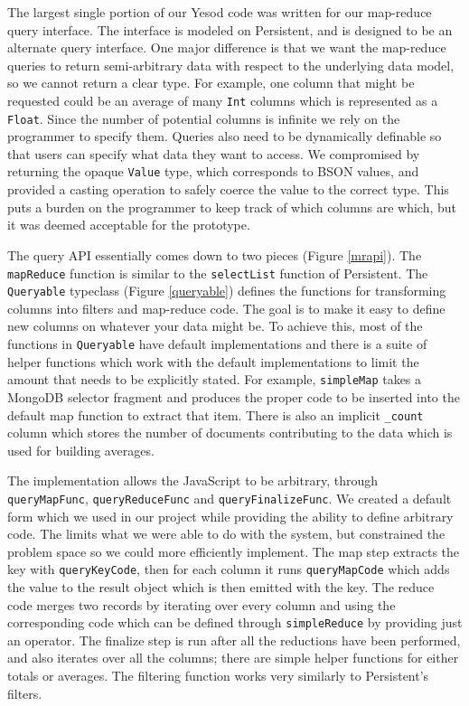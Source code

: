 \documentclass[letterpaper,twocolumn,9pt]{article}
\newcommand{\code}[1]{\texttt{#1}}
\begin{document}
The largest single portion of our Yesod code was written for our map-reduce query interface.  The interface is modeled on Persistent, and is designed to be an alternate query interface.  One major difference is that we want the map-reduce queries to return semi-arbitrary data with respect to the underlying data model, so we cannot return a clear type.  For example, one column that might be requested could be an average of many \code{Int} columns which is represented as a \code{Float}.  Since the number of potential columns is infinite we rely on the programmer to specify them.  Queries also need to be dynamically definable so that users can specify what data they want to access.  We compromised by returning the opaque \code{Value} type, which corresponds to BSON values, and provided a casting operation to safely coerce the value to the correct type.  This puts a burden on the programmer to keep track of which columns are which, but it was deemed acceptable for the prototype.

The query API essentially comes down to two pieces (Figure \ref{mrapi}).  The \code{mapReduce} function is similar to the \code{selectList} function of Persistent.  The \code{Queryable} typeclass (Figure \ref{queryable}) defines the functions for transforming columns into filters and map-reduce code.  The goal is to make it easy to define new columns on whatever your data might be.  To achieve this, most of the functions in \code{Queryable} have default implementations and there is a suite of helper functions which work with the default implementations to limit the amount that needs to be explicitly stated. For example, \code{simpleMap} takes a MongoDB selector fragment and produces the proper code to be inserted into the default map function to extract that item.  There is also an implicit \code{\_count} column which stores the number of documents contributing to the data which is used for building averages.

The implementation allows the JavaScript to be arbitrary, through \code{queryMapFunc}, \code{queryReduceFunc} and \code{queryFinalizeFunc}.  We created a default form which we used in our project while providing the ability to define arbitrary code.  The limits what we were able to do with the system, but constrained the problem space so we could more efficiently implement.  The map step extracts the key with \code{queryKeyCode}, then for each column it runs \code{queryMapCode} which adds the value to the result object which is then emitted with the key.  The reduce code merges two records by iterating over every column and using the corresponding code which can be defined through \code{simpleReduce} by providing just an operator.  The finalize step is run after all the reductions have been performed, and also iterates over all the columns; there are simple helper functions for either totals or averages.  The filtering function works very similarly to Persistent's filters.
\end{document}
